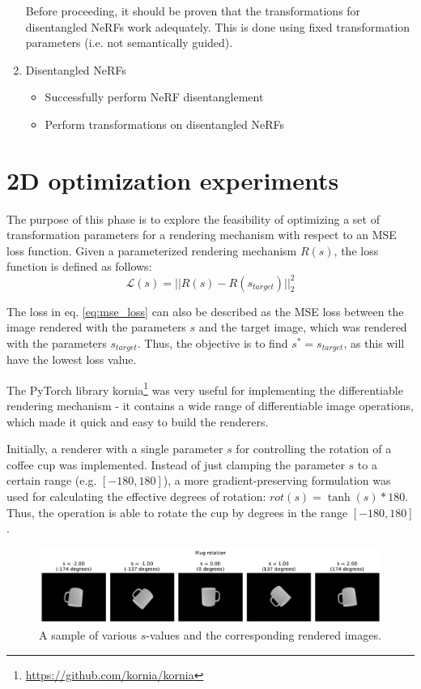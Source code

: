 \begin{enumerate}
    Before proceeding, it should be proven that the transformations for disentangled NeRFs work adequately. This is done using fixed transformation parameters (i.e. not semantically guided).
    \item Disentangled NeRFs
    \begin{itemize}[noitemsep]
        \item Successfully perform NeRF disentanglement
        \item Perform transformations on disentangled NeRFs
    \end{itemize}
\end{enumerate}

\section{2D optimization experiments}
\label{sec:2d-optimization}
The purpose of this phase is to explore the feasibility of optimizing a set of transformation parameters for a rendering mechanism with respect to an MSE loss function. Given a parameterized rendering mechanism $R(s)$, the loss function is defined as follows:
\begin{equation}
    \mathcal{L}(s) = || R(s) - R(s_{target}) ||^2_2
    \label{eq:mse_loss}
\end{equation}

The loss in eq. \ref{eq:mse_loss} can also be described as the MSE loss between the image rendered with the parameters $s$ and the target image, which was rendered with the parameters $s_{target}$. Thus, the objective is to find $s^* = s_{target}$, as this will have the lowest loss value.

The PyTorch library kornia\footnote{\url{https://github.com/kornia/kornia}} was very useful for implementing the differentiable rendering mechanism - it contains a wide range of differentiable image operations, which made it quick and easy to build the renderers.

Initially, a renderer with a single parameter $s$ for controlling the rotation of a coffee cup was implemented. Instead of just clamping the parameter $s$ to a certain range (e.g. $[-180,180]$), a more gradient-preserving formulation was used for calculating the effective degrees of rotation: $rot(s) = \tanh(s)*180$. Thus, the operation is able to rotate the cup by degrees in the range $[-180, 180]$.

\begin{figure}[H]
    \centering
    \includegraphics[width=1.0\textwidth]{figures/3_1-rotations.pdf}
    \caption{A sample of various $s$-values and the corresponding rendered images.}
    \label{fig:3_1-rotations}
\end{figure}

